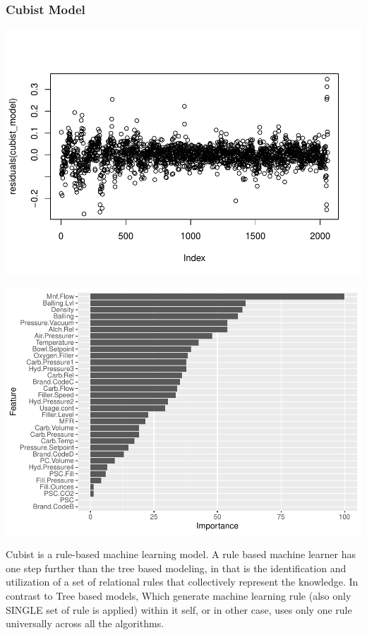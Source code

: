 \documentclass[]{article}
\begin{document}
\subsubsection{Cubist Model}\label{cubist-model}

\begin{center}\includegraphics{OmerOzeren_GracieHan_Project_2_files/figure-latex/unnamed-chunk-22-1} \end{center}

\begin{center}\includegraphics{OmerOzeren_GracieHan_Project_2_files/figure-latex/unnamed-chunk-22-2} \end{center}

Cubist is a rule-based machine learning model. A rule based machine
learner has one step further than the tree based modeling, in that is
the identification and utilization of a set of relational rules that
collectively represent the knowledge. In contrast to Tree based models,
Which generate machine learning rule (also only SINGLE set of rule is
applied) within it self, or in other case, uses only one rule
universally across all the algorithms.
\end{document}
